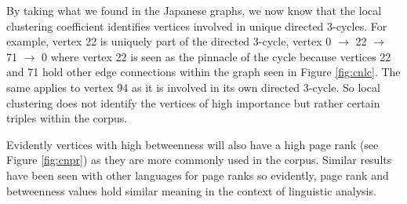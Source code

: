 By taking what we found in the Japanese graphs, we now know that the local clustering coefficient identifies vertices involved in unique directed 3-cycles. For example, vertex 22 is uniquely part of the directed 3-cycle, vertex 0 $\rightarrow$ 22 $\rightarrow$ 71 $\rightarrow$ 0 where vertex 22 is seen as the pinnacle of the cycle because vertices 22 and 71 hold other edge connections within the graph seen in Figure \ref{fig:cnlc}. The same applies to vertex 94 as it is involved in its own directed 3-cycle. So local clustering does not identify the vertices of high importance but rather certain triples within the corpus.

Evidently vertices with high betweenness will also have a high page rank (see Figure \ref{fig:cnpr}) as they are more commonly used in the corpus. Similar results have been seen with other languages for page ranks so evidently, page rank and betweenness values hold similar meaning in the context of linguistic analysis.


